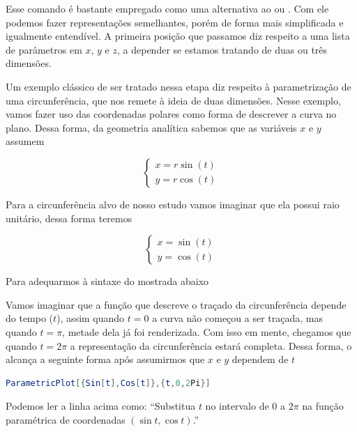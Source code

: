 \documentclass[a4paper, 12pt]{article}
\begin{document}
Esse comando é bastante empregado como uma alternativa ao  ou . Com ele podemos fazer representações semelhantes, porém de forma mais simplificada e igualmente entendível. A primeira posição que passamos diz respeito a uma lista de parâmetros em $x$, $y$ e $z$, a depender se estamos tratando de duas ou três dimensões. 

Um exemplo clássico de ser tratado nessa etapa diz respeito à parametrização de uma circunferência, que nos remete à ideia de duas dimensões. Nesse exemplo, vamos fazer uso das coordenadas polares como forma de descrever a curva no plano. Dessa forma, da geometria analítica sabemos que as variáveis $x$ e $y$ assumem 

$$
\begin{cases}
	x=r\sin(t)\\
	y=r\cos(t)
\end{cases}
$$

Para a circunferência alvo de nosso estudo vamos imaginar que ela possui raio unitário, dessa forma teremos

$$
\begin{cases}
	x=\sin(t)\\
	y=\cos(t)
\end{cases}
$$

Para adequarmos à sintaxe do  mostrada abaixo

\begin{center}
\end{center}

Vamos imaginar que a função que descreve o traçado da circunferência depende do tempo ($t$), assim quando $t=0$ a curva não começou a ser traçada, mas quando $t=\pi$, metade dela já foi renderizada. Com isso em mente, chegamos que quando $t=2\pi$ a representação da circunferência estará completa. Dessa forma, o  alcança a seguinte forma após assumirmos que $x$ e $y$ dependem de $t$

\begin{lstlisting}[language=Mathematica]
ParametricPlot[{Sin[t],Cos[t]},{t,0,2Pi}]
\end{lstlisting}

Podemos ler a linha acima como: ``Substitua $t$ no intervalo de 0 a $2\pi$ na função paramétrica de coordenadas $(\sin t,\cos t)$.''
\end{document}
